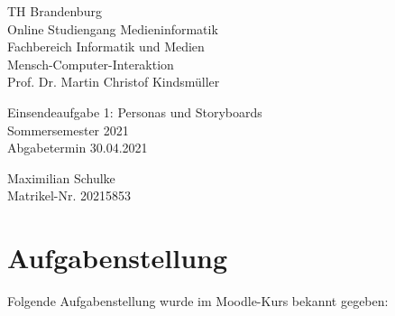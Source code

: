 \documentclass{article}
\begin{document}
\begin{titlepage}
	\begin{flushleft}
		TH Brandenburg \\
		Online Studiengang Medieninformatik \\
		Fachbereich Informatik und Medien \\
		Mensch-Computer-Interaktion \\
		Prof. Dr. Martin Christof Kindsmüller
	\end{flushleft}

	\vfill

	\begin{center}
		\Large{Einsendeaufgabe 1: Personas und Storyboards}\\[0.5em]
		\large{Sommersemester 2021}\\[0.25em]
		\large{Abgabetermin 30.04.2021}
	\end{center}

	\vfill

	\begin{flushright}
		Maximilian Schulke \\
		Matrikel-Nr. 20215853
	\end{flushright}
\end{titlepage}

\tableofcontents

\vfill

\section{Aufgabenstellung}

Folgende Aufgabenstellung wurde im Moodle-Kurs bekannt gegeben:
\end{document}
